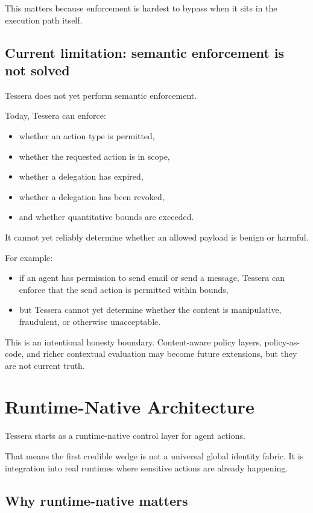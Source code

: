 \documentclass[11pt, a4paper]{article}
\begin{document}
This matters because enforcement is hardest to bypass when it sits in the execution path itself.

\subsection{Current limitation: semantic enforcement is not solved}

Tessera does not yet perform semantic enforcement.

Today, Tessera can enforce:

\begin{itemize}
  \item whether an action type is permitted,
  \item whether the requested action is in scope,
  \item whether a delegation has expired,
  \item whether a delegation has been revoked,
  \item and whether quantitative bounds are exceeded.
\end{itemize}

It cannot yet reliably determine whether an allowed payload is benign or harmful.

For example:

\begin{itemize}
  \item if an agent has permission to send email or send a message, Tessera can enforce that the send action is permitted within bounds,
  \item but Tessera cannot yet determine whether the content is manipulative, fraudulent, or otherwise unacceptable.
\end{itemize}

This is an intentional honesty boundary. Content-aware policy layers, policy-as-code, and richer contextual evaluation may become future extensions, but they are not current truth.

\section{Runtime-Native Architecture}

Tessera starts as a runtime-native control layer for agent actions.

That means the first credible wedge is not a universal global identity fabric. It is integration into real runtimes where sensitive actions are already happening.

\subsection{Why runtime-native matters}
\end{document}
